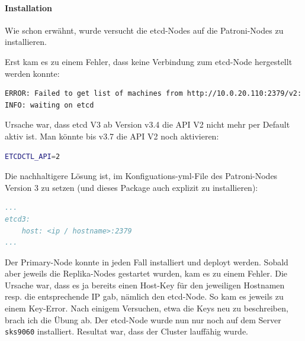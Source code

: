 \begin{flushleft}
    \paragraph{Installation}
    \label{par:patroni_installation}
    Wie schon erwähnt, wurde versucht die \gls{etcd}-Nodes auf die Patroni-Nodes zu installieren.
\end{flushleft}
\begin{flushleft}
    Erst kam es zu einem Fehler, dass keine Verbindung zum \gls{etcd}-Node hergestellt werden konnte:
\lstset{style=gra_codestyle}
\begin{lstlisting}[language=bash, caption=Patroni - etcd API V2 Error,captionpos=b,label={lst:patroni_etcd_api_v2_error},breaklines=true]
ERROR: Failed to get list of machines from http://10.0.20.110:2379/v2: EtcdException('Bad response : 404 page not found\n')
INFO: waiting on etcd
\end{lstlisting}
    Ursache war, dass \gls{etcd} V3 ab Version v3.4 die API V2 nicht mehr per Default aktiv ist.
    Man könnte bis v3.7 die API V2 noch aktivieren:
\lstset{style=gra_codestyle}
\begin{lstlisting}[language=bash, caption=Patroni - etcd API V2 Enable,captionpos=b,label={lst:patroni_etcd_api_v2_enable},breaklines=true]
ETCDCTL_API=2
\end{lstlisting}
    Die nachhaltigere Lösung ist, im Konfiguations-yml-File des Patroni-Nodes Version 3 zu setzen (und dieses Package auch explizit zu installieren):
\lstset{style=gra_codestyle}
\begin{lstlisting}[language=yaml, caption=Patroni - etcd3 Flag,captionpos=b,label={lst:patroni_etcd3_flag},breaklines=true]
...
etcd3:
    host: <ip / hostname>:2379
...
\end{lstlisting}
\end{flushleft}
\begin{flushleft}
    Der Primary-Node konnte in jeden Fall installiert und deployt werden.
    Sobald aber jeweils die Replika-Nodes gestartet wurden, kam es zu einem Fehler.
    Die Ursache war, dass es ja bereits einen Host-Key für den jeweiligen Hostnamen resp.
    die entsprechende IP gab, nämlich den \gls{etcd}-Node.
    So kam es jeweils zu einem Key-Error.
    Nach einigem Versuchen, etwa die Keys neu zu beschreiben, brach ich die Übung ab.
    Der \gls{etcd}-Node wurde nun nur noch auf dem Server \texttt{sks9060} installiert.
    Resultat war, dass der Cluster lauffähig wurde.
\end{flushleft}
